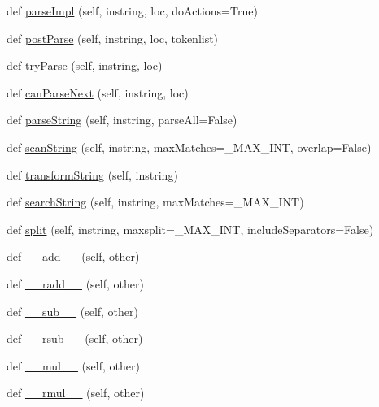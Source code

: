 \begin{DoxyCompactItemize}
\item 
def \hyperlink{classpyparsing_1_1ParserElement_a329bcec7d8f7ef6875b9390787536e5b}{parse\+Impl} (self, instring, loc, do\+Actions=True)
\item 
def \hyperlink{classpyparsing_1_1ParserElement_a3b6548ce7bb9df91108b4f923c25137c}{post\+Parse} (self, instring, loc, tokenlist)
\item 
def \hyperlink{classpyparsing_1_1ParserElement_a0f4f5dac320faf316bd8a54022f4345e}{try\+Parse} (self, instring, loc)
\item 
def \hyperlink{classpyparsing_1_1ParserElement_aa032e6999773cbb5c0048eb9b2b6bacb}{can\+Parse\+Next} (self, instring, loc)
\item 
def \hyperlink{classpyparsing_1_1ParserElement_a0026d86408e4fb2faa89c985dcb89738}{parse\+String} (self, instring, parse\+All=False)
\item 
def \hyperlink{classpyparsing_1_1ParserElement_ae2359510cb75269e8f67637112ca4783}{scan\+String} (self, instring, max\+Matches=\+\_\+\+M\+A\+X\+\_\+\+I\+NT, overlap=False)
\item 
def \hyperlink{classpyparsing_1_1ParserElement_aafab376b2c6bc61873e532f2042d5425}{transform\+String} (self, instring)
\item 
def \hyperlink{classpyparsing_1_1ParserElement_abd33d51600731c951b6bc96452fa6bdd}{search\+String} (self, instring, max\+Matches=\+\_\+\+M\+A\+X\+\_\+\+I\+NT)
\item 
def \hyperlink{classpyparsing_1_1ParserElement_a8db51e82054675b073d5d03b58da4091}{split} (self, instring, maxsplit=\+\_\+\+M\+A\+X\+\_\+\+I\+NT, include\+Separators=False)
\item 
def \hyperlink{classpyparsing_1_1ParserElement_a21a06c8513b9a6be62c04b3f9589b985}{\+\_\+\+\_\+add\+\_\+\+\_\+} (self, other)
\item 
def \hyperlink{classpyparsing_1_1ParserElement_a34941605b7030012a62dca995bda150c}{\+\_\+\+\_\+radd\+\_\+\+\_\+} (self, other)
\item 
def \hyperlink{classpyparsing_1_1ParserElement_afd1c67a708145e87a941f1ef32858821}{\+\_\+\+\_\+sub\+\_\+\+\_\+} (self, other)
\item 
def \hyperlink{classpyparsing_1_1ParserElement_a1c075a3fb139c15e476cd8c0f0fb143e}{\+\_\+\+\_\+rsub\+\_\+\+\_\+} (self, other)
\item 
def \hyperlink{classpyparsing_1_1ParserElement_ada800b289dc07ee269e242ae6f877a4b}{\+\_\+\+\_\+mul\+\_\+\+\_\+} (self, other)
\item 
def \hyperlink{classpyparsing_1_1ParserElement_a2efd1d93a31fbff485aa32b1e9fc2059}{\+\_\+\+\_\+rmul\+\_\+\+\_\+} (self, other)

\end{DoxyCompactItemize}
